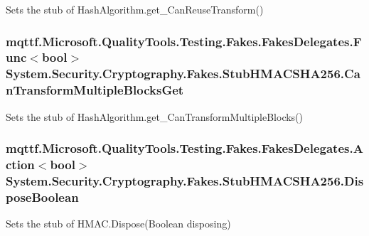 Sets the stub of Hash\-Algorithm.\-get\-\_\-\-Can\-Reuse\-Transform()

\hypertarget{class_system_1_1_security_1_1_cryptography_1_1_fakes_1_1_stub_h_m_a_c_s_h_a256_a5c6574b0647a81e0559eb7112bae01b7}{
\subsubsection[{Can\-Transform\-Multiple\-Blocks\-Get}]{\setlength{\rightskip}{0pt plus 5cm}mqttf.\-Microsoft.\-Quality\-Tools.\-Testing.\-Fakes.\-Fakes\-Delegates.\-Func$<$bool$>$ System.\-Security.\-Cryptography.\-Fakes.\-Stub\-H\-M\-A\-C\-S\-H\-A256.\-Can\-Transform\-Multiple\-Blocks\-Get}}\label{class_system_1_1_security_1_1_cryptography_1_1_fakes_1_1_stub_h_m_a_c_s_h_a256_a5c6574b0647a81e0559eb7112bae01b7}


Sets the stub of Hash\-Algorithm.\-get\-\_\-\-Can\-Transform\-Multiple\-Blocks()

\hypertarget{class_system_1_1_security_1_1_cryptography_1_1_fakes_1_1_stub_h_m_a_c_s_h_a256_a44784b5c3f3310c785d373ebb1e9780d}{
\subsubsection[{Dispose\-Boolean}]{\setlength{\rightskip}{0pt plus 5cm}mqttf.\-Microsoft.\-Quality\-Tools.\-Testing.\-Fakes.\-Fakes\-Delegates.\-Action$<$bool$>$ System.\-Security.\-Cryptography.\-Fakes.\-Stub\-H\-M\-A\-C\-S\-H\-A256.\-Dispose\-Boolean}}\label{class_system_1_1_security_1_1_cryptography_1_1_fakes_1_1_stub_h_m_a_c_s_h_a256_a44784b5c3f3310c785d373ebb1e9780d}


Sets the stub of H\-M\-A\-C.\-Dispose(\-Boolean disposing)

